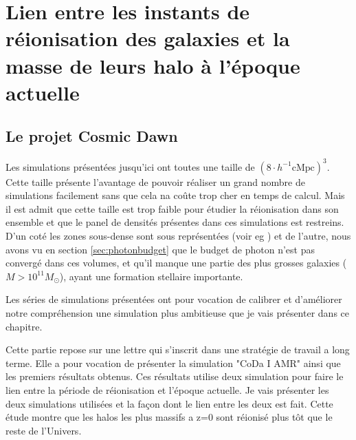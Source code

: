 \chapter{Lien entre les instants de réionisation des galaxies et la masse de leurs halo à l'époque actuelle}

\section{Le projet Cosmic Dawn}
\label{sec:CODAEMMA}

Les simulations présentées jusqu'ici ont toutes une taille de $\left( 8\cdot h^{-1} \mathrm{cMpc} \right)^3$.
Cette taille présente l'avantage de pouvoir réaliser un grand nombre de simulations facilement sans que cela na coûte trop cher en temps de calcul.
Mais il est admit que cette taille est trop faible pour étudier la réionisation dans son ensemble et que le panel de densités présentes dans ces simulations est restreins.
D'un coté les zones sous-dense sont sous représentées  (voir eg \cite{iliev_simulating_2006}) et de l'autre, nous avons vu en section \ref{sec:photonbudget} que le budget de photon n'est pas convergé dans ces volumes, et qu'il manque une partie des plus grosses galaxies ($M>10^{11}M_\odot$), ayant une formation stellaire importante.

Les séries de simulations présentées ont pour vocation de calibrer et d'améliorer notre compréhension une simulation plus ambitieuse que je vais présenter dans ce chapitre.

Cette partie repose sur une lettre qui s'inscrit dans une stratégie de travail a long terme.
Elle a pour vocation de présenter la simulation "\ac{CoDa} I AMR" ainsi que les premiers résultats obtenus.
Ces résultats utilise deux simulation pour faire le lien entre la période de réionisation et l’époque actuelle.
Je vais présenter les deux simulations utilisées et la façon dont le lien entre les deux est fait.
Cette étude montre que les halos les plus massifs a z=0 sont réionisé plus tôt que le reste de l'Univers.


